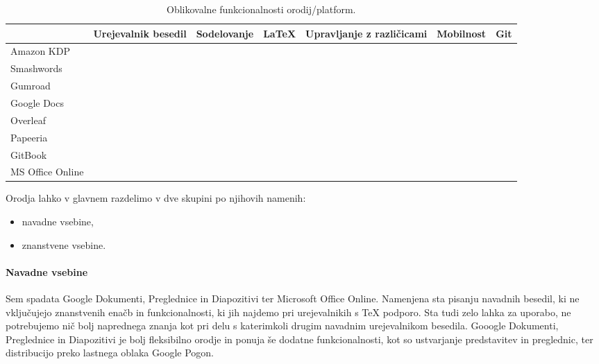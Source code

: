 \documentclass[a4paper, 12pt]{book}
\begin{document}
\begin{table}[h]
	\begin{center}
		\begin{tabular}{ | l | m{1.5cm} | m{1.5cm} |m{1cm} | m{1.8cm} | m{1.2cm} | m{0.7cm} |}
			\hline
			& \hspace*{0pt}Urejevalnik besedil & \hspace*{0pt}Sodelovanje & \hspace*{0pt}\LaTeX & \hspace*{0pt}Upravljanje z različicami & \hspace*{0pt}Mobilnost & \hspace*{0pt}Git  \\ \hline
			Amazon KDP & & & & \checkmark & & \\
			Smashwords & & & & \checkmark & & \\
			Gumroad    & & & & \checkmark & & \\
			Google Docs & \checkmark & \checkmark &  & \checkmark & \checkmark &   \\
			Overleaf & \checkmark & \checkmark & \checkmark & \checkmark & \checkmark & \checkmark \\
			Papeeria & \checkmark & \checkmark & \checkmark & \checkmark  & \checkmark & \checkmark \\
			GitBook & \checkmark & \checkmark &  & \checkmark & \checkmark & \checkmark \\
			MS Office Online & \checkmark & \checkmark &  & \checkmark & \checkmark &  \\	 
			\hline
		\end{tabular}
	\end{center} 
	\caption{Oblikovalne funkcionalnosti orodij/platform.}
	\label{tbl:orodja}
\end{table}

Orodja lahko v glavnem razdelimo v dve skupini po njihovih namenih:
\begin{itemize}
	\item navadne vsebine,
	\item znanstvene vsebine.
\end{itemize}

\paragraph{Navadne vsebine}
Sem spadata Google Dokumenti, Preglednice in Diapozitivi ter Microsoft Office Online. Namenjena sta pisanju navadnih besedil, ki ne vključujejo znanstvenih enačb in funkcionalnosti, ki jih najdemo pri urejevalnikih s TeX podporo. Sta tudi zelo lahka za uporabo, ne potrebujemo nič bolj naprednega znanja kot pri delu s katerimkoli drugim navadnim urejevalnikom besedila. Gooogle Dokumenti, Preglednice in Diapozitivi je bolj fleksibilno orodje in ponuja še dodatne funkcionalnosti, kot so ustvarjanje predstavitev in preglednic, ter distribucijo preko lastnega oblaka Google Pogon.
\end{document}
